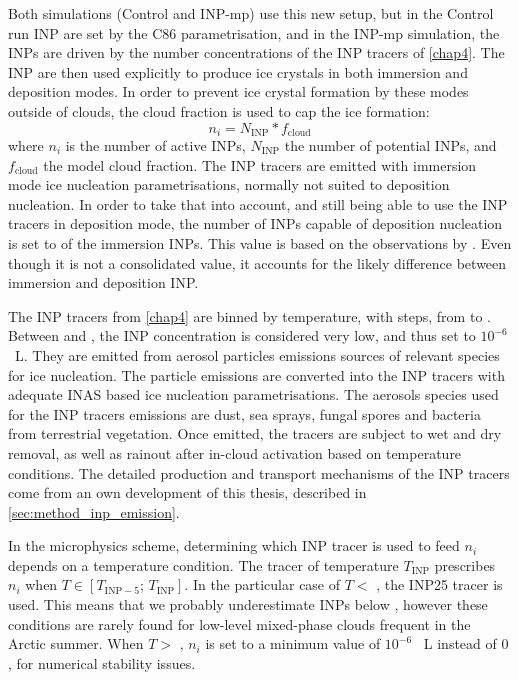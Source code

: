      Both simulations (Control and INP-mp) use this new setup, but in the Control run INP are set by the C86 parametrisation, and in the INP-mp simulation, the INPs are driven by the number concentrations of the INP tracers of \cref{chap4}. The INP are then used explicitly to produce ice crystals in both immersion and deposition modes. In order to prevent ice crystal formation by these modes outside of clouds, the cloud fraction is used to cap the ice formation:
    \begin{equation}
        n_i = N_{\text{INP}} * f_{\text{cloud}}
    \end{equation}
    where $n_i$ is the number of active INPs, $N_{\text{INP}}$ the number of potential INPs, and $f_{\text{cloud}}$ the model cloud fraction.
    The INP tracers are emitted with immersion mode ice nucleation parametrisations, normally not suited to deposition nucleation.
    In order to take that into account, and still being able to use the INP tracers in deposition mode, the number of INPs capable of deposition nucleation is set to  of the immersion INPs. This value is based on the observations by \citet{schrod_long-term_2020}. Even though it is not a consolidated value, it accounts for the likely difference between immersion and deposition INP. 

    The INP tracers from \cref{chap4} are binned by temperature, with  steps, from  to . Between  and , the INP concentration is considered very low, and thus set to $10^{-6}$ \si{\per\liter}.
    They are emitted from aerosol particles emissions sources of relevant species for ice nucleation. The particle emissions are converted into the INP tracers with adequate INAS based ice nucleation parametrisations.
    The aerosols species used for the INP tracers emissions are dust, sea sprays, fungal spores and bacteria from terrestrial vegetation.
    Once emitted, the tracers are subject to wet and dry removal, as well as rainout after in-cloud activation based on temperature conditions.
    The detailed production and transport mechanisms of the INP tracers come from an own development of this thesis, described in \cref{sec:method_inp_emission}.

    In the microphysics scheme, determining which INP tracer is used to feed $n_i$ depends on a temperature condition.
    The tracer of temperature $T_{\text{INP}}$ prescribes $n_i$ when $T \in [T_{\text{INP} - 5};\, T_{\text{INP}}]$.
    In the particular case of $T <$ , the INP25 tracer is used. This means that we probably underestimate INPs below , however these conditions are rarely found for low-level mixed-phase clouds frequent in the Arctic summer. When $T>$ , $n_i$ is set to a minimum value of $10^{-6}$ \si{\per\liter} instead of $0$, for numerical stability issues.
    
